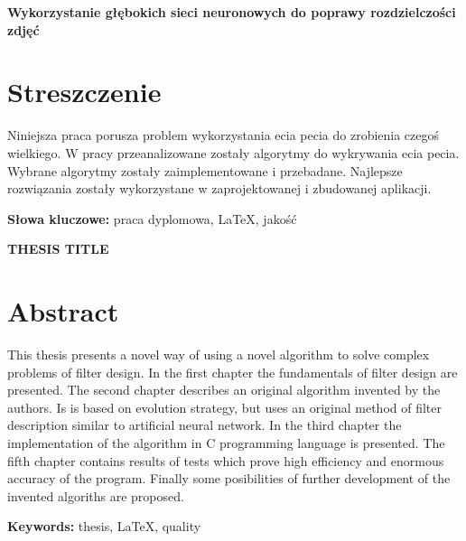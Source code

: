\newpage
\begin{center}
\large \bf
Wykorzystanie głębokich sieci neuronowych do poprawy rozdzielczości zdjęć
\end{center}

\section*{Streszczenie}
Niniejsza praca porusza problem wykorzystania ecia pecia do zrobienia czegoś wielkiego. W pracy przeanalizowane zostały algorytmy do wykrywania ecia pecia. Wybrane algorytmy zostały zaimplementowane i przebadane. Najlepsze rozwiązania zostały wykorzystane w zaprojektowanej i zbudowanej aplikacji.

\bigskip
{\noindent\bf Słowa kluczowe:} praca dyplomowa, LaTeX, jakość

\vskip 2cm

\newpage


\begin{center}
\large \bf
THESIS TITLE
\end{center}

\section*{Abstract}
This thesis presents a novel way of using a novel algorithm to solve complex
problems of filter design. In the first chapter the fundamentals of filter design
are presented. The second chapter describes an original algorithm invented by the
authors. Is is based on evolution strategy, but uses an original method of filter
description similar to artificial neural network. In the third chapter the implementation
of the algorithm in C programming language is presented. The fifth chapter contains results
of tests which prove high efficiency and enormous accuracy of the program. Finally some
posibilities of further development of the invented algoriths are proposed.

\bigskip
{\noindent\bf Keywords:} thesis, LaTeX, quality

\vfill